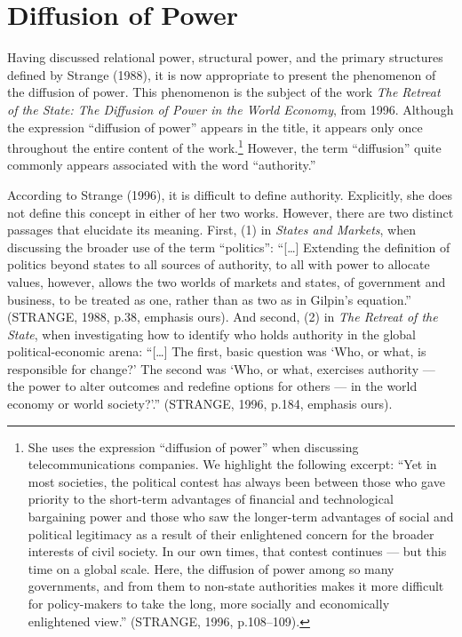 \section{Diffusion of Power}

Having discussed relational power, structural power, and the primary structures defined by Strange (1988), it is now appropriate to present the phenomenon of the diffusion of power. This phenomenon is the subject of the work \textit{The Retreat of the State: The Diffusion of Power in the World Economy}, from 1996. Although the expression ``diffusion of power'' appears in the title, it appears only once throughout the entire content of the work.\footnote{She uses the expression ``diffusion of power'' when discussing telecommunications companies. We highlight the following excerpt: ``Yet in most societies, the political contest has always been between those who gave priority to the short-term advantages of financial and technological bargaining power and those who saw the longer-term advantages of social and political legitimacy as a result of their enlightened concern for the broader interests of civil society. In our own times, that contest continues --- but this time on a global scale. Here, the diffusion of power among so many governments, and from them to non-state authorities makes it more difficult for policy-makers to take the long, more socially and economically enlightened view.'' (STRANGE, 1996, p.108--109).} However, the term ``diffusion'' quite commonly appears associated with the word ``authority.''

According to Strange (1996), it is difficult to define authority. Explicitly, she does not define this concept in either of her two works. However, there are two distinct passages that elucidate its meaning. First, (1) in \textit{States and Markets}, when discussing the broader use of the term ``politics'': ``{[}\ldots{]} Extending the definition of politics beyond states to all sources of authority, to all with power to allocate values, however, allows the two worlds of markets and states, of government and business, to be treated as one, rather than as two as in Gilpin's equation.'' (STRANGE, 1988, p.38, emphasis ours). And second, (2) in \textit{The Retreat of the State}, when investigating how to identify who holds authority in the global political-economic arena: ``{[}\ldots{]} The first, basic question was `Who, or what, is responsible for change?' The second was `Who, or what, exercises authority --- the power to alter outcomes and redefine options for others --- in the world economy or world society?'.'' (STRANGE, 1996, p.184, emphasis ours).

